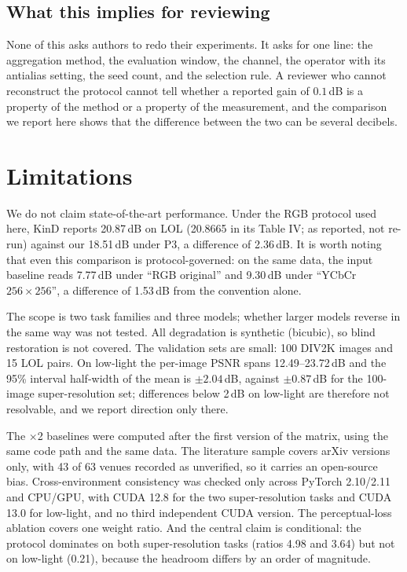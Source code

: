 \documentclass[10pt,twocolumn]{article}
\begin{document}


\subsection{What this implies for reviewing}

None of this asks authors to redo their experiments. It asks for one line:
the aggregation method, the evaluation window, the channel, the operator
with its antialias setting, the seed count, and the selection rule. A
reviewer who cannot reconstruct the protocol cannot tell whether a reported
gain of $0.1$\,dB is a property of the method or a property of the
measurement, and the comparison we report here shows that the difference
between the two can be several decibels.

\section{Limitations}

We do not claim state-of-the-art performance. Under the RGB protocol used
here, KinD reports 20.87\,dB on LOL (20.8665 in its Table IV; as reported,
not re-run) against our 18.51\,dB under P3, a difference of 2.36\,dB. It is
worth noting that even this comparison is protocol-governed: on the same
data, the input baseline reads 7.77\,dB under ``RGB original'' and
9.30\,dB under ``YCbCr $256\times256$'', a difference of 1.53\,dB from the
convention alone.

The scope is two task families and three models; whether larger models
reverse in the same way was not tested. All degradation is synthetic
(bicubic), so blind restoration is not covered. The validation sets are
small: 100 DIV2K images and 15 LOL pairs. On low-light the per-image PSNR
spans 12.49--23.72\,dB and the 95\% interval half-width of the mean is
$\pm2.04$\,dB, against $\pm0.87$\,dB for the 100-image super-resolution set;
differences below 2\,dB on low-light are therefore not resolvable, and we
report direction only there.

The $\times$2 baselines were computed after the first version of the
matrix, using the same code path and the same data. The literature sample
covers arXiv versions only, with 43 of 63 venues recorded as unverified,
so it carries an open-source bias. Cross-environment consistency was checked
only across PyTorch 2.10/2.11 and CPU/GPU, with CUDA 12.8 for the two
super-resolution tasks and CUDA 13.0 for low-light, and no third
independent CUDA version. The perceptual-loss ablation covers one weight
ratio. And the central claim is conditional: the protocol dominates on both
super-resolution tasks (ratios 4.98 and 3.64) but not on low-light (0.21),
because the headroom differs by an order of magnitude.
\end{document}
